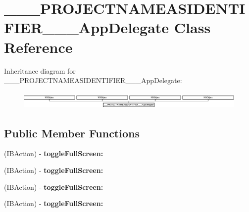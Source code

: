 \hypertarget{interface_______p_r_o_j_e_c_t_n_a_m_e_a_s_i_d_e_n_t_i_f_i_e_r_______app_delegate}{\section{\-\_\-\-\_\-\-\_\-\-P\-R\-O\-J\-E\-C\-T\-N\-A\-M\-E\-A\-S\-I\-D\-E\-N\-T\-I\-F\-I\-E\-R\-\_\-\-\_\-\-\_\-\-App\-Delegate Class Reference}
\label{interface_______p_r_o_j_e_c_t_n_a_m_e_a_s_i_d_e_n_t_i_f_i_e_r_______app_delegate}
}
Inheritance diagram for \-\_\-\-\_\-\-\_\-\-P\-R\-O\-J\-E\-C\-T\-N\-A\-M\-E\-A\-S\-I\-D\-E\-N\-T\-I\-F\-I\-E\-R\-\_\-\-\_\-\-\_\-\-App\-Delegate\-:\begin{figure}[H]
\begin{center}
\leavevmode
\includegraphics[height=0.897436cm]{interface_______p_r_o_j_e_c_t_n_a_m_e_a_s_i_d_e_n_t_i_f_i_e_r_______app_delegate}
\end{center}
\end{figure}
\subsection*{Public Member Functions}
\begin{DoxyCompactItemize}
\item 
\hypertarget{interface_______p_r_o_j_e_c_t_n_a_m_e_a_s_i_d_e_n_t_i_f_i_e_r_______app_delegate_a96b614319e687fe263403b325e9980c5}{(I\-B\-Action) -\/ {\bfseries toggle\-Full\-Screen\-:}}\label{interface_______p_r_o_j_e_c_t_n_a_m_e_a_s_i_d_e_n_t_i_f_i_e_r_______app_delegate_a96b614319e687fe263403b325e9980c5}

\item 
\hypertarget{interface_______p_r_o_j_e_c_t_n_a_m_e_a_s_i_d_e_n_t_i_f_i_e_r_______app_delegate_a96b614319e687fe263403b325e9980c5}{(I\-B\-Action) -\/ {\bfseries toggle\-Full\-Screen\-:}}\label{interface_______p_r_o_j_e_c_t_n_a_m_e_a_s_i_d_e_n_t_i_f_i_e_r_______app_delegate_a96b614319e687fe263403b325e9980c5}

\item 
\hypertarget{interface_______p_r_o_j_e_c_t_n_a_m_e_a_s_i_d_e_n_t_i_f_i_e_r_______app_delegate_a96b614319e687fe263403b325e9980c5}{(I\-B\-Action) -\/ {\bfseries toggle\-Full\-Screen\-:}}\label{interface_______p_r_o_j_e_c_t_n_a_m_e_a_s_i_d_e_n_t_i_f_i_e_r_______app_delegate_a96b614319e687fe263403b325e9980c5}

\item 
\hypertarget{interface_______p_r_o_j_e_c_t_n_a_m_e_a_s_i_d_e_n_t_i_f_i_e_r_______app_delegate_a96b614319e687fe263403b325e9980c5}{(I\-B\-Action) -\/ {\bfseries toggle\-Full\-Screen\-:}}\label{interface_______p_r_o_j_e_c_t_n_a_m_e_a_s_i_d_e_n_t_i_f_i_e_r_______app_delegate_a96b614319e687fe263403b325e9980c5}

\end{DoxyCompactItemize}
